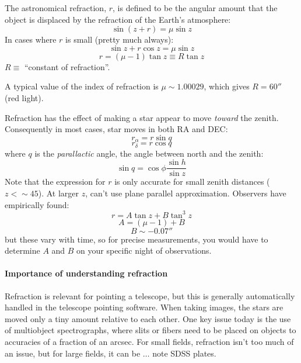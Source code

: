 \documentclass[12pt]{article}
\begin{document}
The astronomical refraction, $r$, is defined to be the angular amount that
the object is displaced by the refraction of the Earth's atmosphere:
\[
    \sin(z+r) = \mu\sin{z}
    \]
In cases where $r$ is small (pretty much always):
\[
    \sin{z} + r\cos{z} = \mu\sin{z}
    \]
\[
    r = (\mu-1) \tan{z} \equiv R\tan{z}
    \]
$R \equiv$ ``constant of refraction''.

A typical value of the index of refraction is $\mu \sim 1.00029$, which
gives $R = 60''$ (red light).

Refraction has the effect of making a star appear to move \emph{toward} the
zenith. Consequently in most cases, star moves in both RA and DEC:
\[
    r_{\alpha} = r\sin{q}
    \]
\[
    r_{\delta} = r\cos{q}
    \]
where $q$ is the \textit{parallactic} angle, the angle between north and
the zenith:
\[
    \sin{q} = \cos\phi\frac{\sin{h}}{\sin{z}}
    \]
Note that the expression for $r$ is only accurate for small zenith
distances ($z < \sim 45$). At larger $z$, can't use plane parallel
approximation. Observers have empirically found:
\[
    r = A\tan{z} + B\tan^{3}z
    \]
\[
    A = (\mu - 1) + B
    \]
\[
    B \sim -0.07''
    \]
but these vary with time, so for precise measurements, you would have
to determine $A$ and $B$ on your specific night of observations.

\paragraph{Importance of understanding refraction}
Refraction is relevant for pointing a telescope, but this is generally
automatically handled in the telescope pointing software. When taking
images, the stars are moved only a tiny amount relative to each other.
One key issue today is the use of multiobject spectrographs, where slits or
fibers need to be placed on objects to accuracies of a fraction of an arcsec.
For small fields, refraction isn't too much of an issue, but for large fields,
it can be $\ldots$ note SDSS plates.
\end{document}
